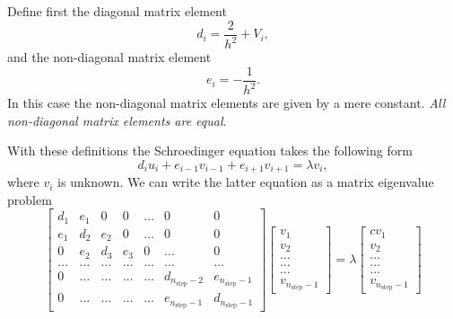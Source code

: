 \documentclass[graybox,envcountchap,sectrefs]{svmult}
\begin{document}
Define first the diagonal matrix element
\[
   d_i=\frac{2}{h^2}+V_i,
\]
and the non-diagonal matrix element
\[
   e_i=-\frac{1}{h^2}.
\]
In this case the non-diagonal matrix elements are given by a mere constant. \emph{All non-diagonal matrix elements are equal}.

With these definitions the Schroedinger equation takes the following form
\[
d_iu_i+e_{i-1}v_{i-1}+e_{i+1}v_{i+1}  = \lambda v_i,
\]
where $v_i$ is unknown. We can write the
latter equation as a matrix eigenvalue problem
\begin{equation}
    \begin{bmatrix} d_1 & e_1 & 0   & 0    & \dots  &0     & 0 \\
                                e_1 & d_2 & e_2 & 0    & \dots  &0     &0 \\
                                0   & e_2 & d_3 & e_3  &0       &\dots & 0\\
                                \dots  & \dots & \dots & \dots  &\dots      &\dots & \dots\\
                                0   & \dots & \dots & \dots  &\dots       &d_{n_{\mathrm{step}}-2} & e_{n_{\mathrm{step}}-1}\\
                                0   & \dots & \dots & \dots  &\dots       &e_{n_{\mathrm{step}}-1} & d_{n_{\mathrm{step}}-1}
             \end{bmatrix}      \begin{bmatrix} v_{1} \\
                                                              v_{2} \\
                                                              \dots\\ \dots\\ \dots\\
                                                              v_{n_{\mathrm{step}}-1}
             \end{bmatrix}=\lambda \begin{bmatrix}{c} v_{1} \\
                                                              v_{2} \\
                                                              \dots\\ \dots\\ \dots\\
                                                              v_{n_{\mathrm{step}}-1}
             \end{bmatrix}
      \label{eq:sematrix}
\end{equation}
\end{document}
